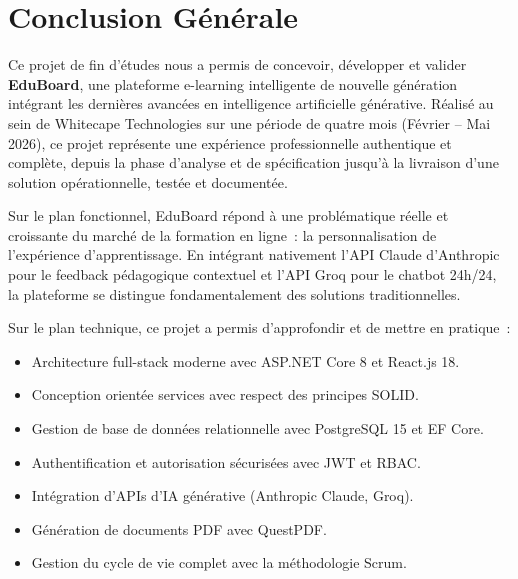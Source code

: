 \chapter*{Conclusion Générale}

Ce projet de fin d'études nous a permis de concevoir, développer et valider
\textbf{EduBoard}, une plateforme e-learning intelligente de nouvelle génération
intégrant les dernières avancées en intelligence artificielle générative. Réalisé au
sein de Whitecape Technologies sur une période de quatre mois (Février – Mai 2026),
ce projet représente une expérience professionnelle authentique et complète, depuis la
phase d'analyse et de spécification jusqu'à la livraison d'une solution opérationnelle,
testée et documentée.

\medskip

Sur le plan fonctionnel, EduBoard répond à une problématique réelle et croissante du
marché de la formation en ligne~: la personnalisation de l'expérience d'apprentissage.
En intégrant nativement l'API Claude d'Anthropic pour le feedback pédagogique
contextuel et l'API Groq pour le chatbot 24h/24, la plateforme se distingue
fondamentalement des solutions traditionnelles.

\medskip

Sur le plan technique, ce projet a permis d'approfondir et de mettre en pratique~:
\begin{itemize}
  \item Architecture full-stack moderne avec ASP.NET Core 8 et React.js 18.
  \item Conception orientée services avec respect des principes SOLID.
  \item Gestion de base de données relationnelle avec PostgreSQL 15 et EF Core.
  \item Authentification et autorisation sécurisées avec JWT et RBAC.
  \item Intégration d'APIs d'\ac{IA} générative (Anthropic Claude, Groq).
  \item Génération de documents PDF avec QuestPDF.
  \item Gestion du cycle de vie complet avec la méthodologie Scrum.
\end{itemize}

\medskip

